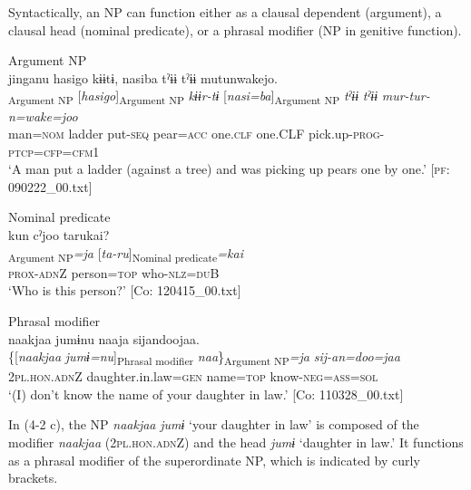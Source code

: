 Syntactically, an NP can function either as a clausal dependent (argument), a clausal head (nominal predicate), or a phrasal modifier (NP in genitive function).

\ea\label{ex:4.2}
\ea\label{ex:4.2a}Argument NP\\
\glll      jinganu  {\textbar}hasigo{\textbar}  kɨɨtɨ,  nasiba   tˀɨɨ  tˀɨɨ  mutunwakejo.\\
      [\textit{jinga=nu}]\textsubscript{Argument NP}  [\textit{hasigo}]\textsubscript{Argument NP}  \textit{kɨɨr-tɨ}  [\textit{nasi=ba}]\textsubscript{Argument NP}         \textit{tˀɨɨ}  \textit{tˀɨɨ}  \textit{mur-tur-n=wake=joo}\\
      man=\textsc{nom}  ladder  put-\textsc{seq}  pear=\textsc{acc}      one.\textsc{clf}  one.CLF  pick.up-\textsc{prog}-\textsc{ptcp}=\textsc{cfp}=\textsc{cfm}1     \\
      \glt       ‘A man put a ladder (against a tree) and was picking up pears one by one.’ [\textsc{pf}: 090222\_00.txt]

\ex\label{ex:4.2b}Nominal predicate\\
\glll     kun  cˀjoo  tarukai?\\
      [\textit{ku-n}  \textit{cˀju}]\textsubscript{Argument NP}\textit{=ja}  [\textit{ta-ru}]\textsubscript{Nominal predicate}\textit{=kai}\\
      \textsc{prox}-\textsc{adn}Z  person=\textsc{top}  who-\textsc{nlz}=\textsc{du}B\\
      \glt       ‘Who is this person?’ [Co: 120415\_00.txt]

\ex\label{ex:4.2c}Phrasal modifier\\
\glll      naakjaa  jumɨnu  naaja  sijandoojaa.\\
      \{[\textit{naakjaa}  \textit{jumɨ=nu}]\textsubscript{Phrasal modifier}  \textit{naa}\}\textsubscript{Argument NP}\textit{=ja}  \textit{sij-an=doo=jaa}\\
      2\textsc{pl}.\textsc{hon}.\textsc{adn}Z  daughter.in.law=\textsc{gen}  name=\textsc{top}  know-\textsc{neg}=\textsc{ass}=\textsc{sol}\\
      \glt       ‘(I) don’t know the name of your daughter in law.’ [Co: 110328\_00.txt]
    \z
\z

In (4-2 c), the NP \textit{naakjaa} \textit{jumɨ} ‘your daughter in law’ is composed of the modifier \textit{naakjaa} (2\textsc{pl}.\textsc{hon}.\textsc{adn}Z) and the head \textit{jumɨ} ‘daughter in law.’ It functions as a phrasal modifier of the superordinate NP, which is indicated by curly brackets.

